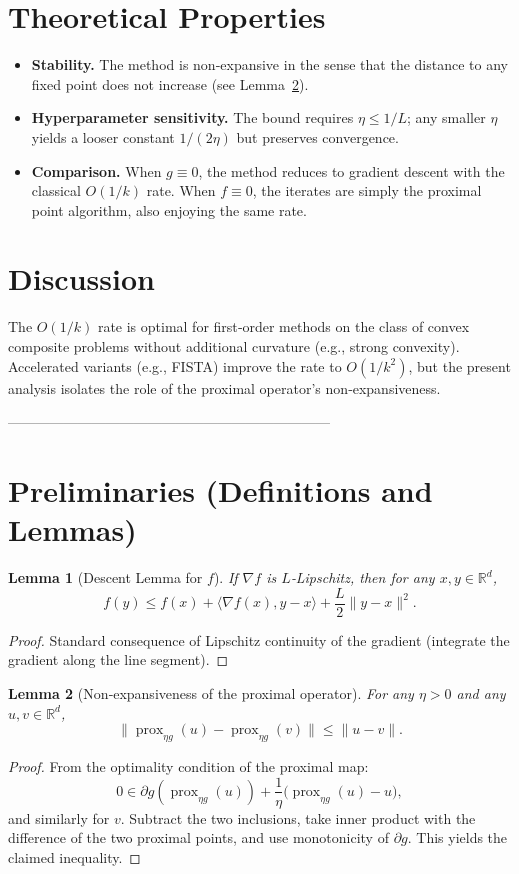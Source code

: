 \documentclass{article}
\newtheorem{lemma}{Lemma}
\newcommand{\prox}{\operatorname{prox}}
\newcommand{\grad}{\nabla}
\newcommand{\R}{\mathbb{R}}
\begin{document}
\section*{Theoretical Properties}
\begin{itemize}
  \item \textbf{Stability.} The method is non‑expansive in the sense that the distance to any fixed point does not increase (see Lemma~\ref{lem:nonexp}).
  \item \textbf{Hyperparameter sensitivity.} The bound requires $\eta\le 1/L$; any smaller $\eta$ yields a looser constant $1/(2\eta)$ but preserves convergence.
  \item \textbf{Comparison.} When $g\equiv0$, the method reduces to gradient descent with the classical $O(1/k)$ rate. When $f\equiv0$, the iterates are simply the proximal point algorithm, also enjoying the same rate.
\end{itemize}

\section*{Discussion}
The $O(1/k)$ rate is optimal for first‑order methods on the class of convex composite problems without additional curvature (e.g., strong convexity). Accelerated variants (e.g., FISTA) improve the rate to $O(1/k^{2})$, but the present analysis isolates the role of the proximal operator’s non‑expansiveness.

---------------------------------------------------------------------

\section*{Preliminaries (Definitions and Lemmas)}
\begin{lemma}[Descent Lemma for $f$]\label{lem:descent}
If $\grad f$ is $L$‑Lipschitz, then for any $x,y\in\R^{d}$,
\[
f(y)\le f(x)+\langle\grad f(x),y-x\rangle+\frac{L}{2}\|y-x\|^{2}.
\]
\end{lemma}
\begin{proof}
Standard consequence of Lipschitz continuity of the gradient (integrate the gradient along the line segment). \hfill\qedsymbol
\end{proof}
\begin{lemma}[Non‑expansiveness of the proximal operator]\label{lem:nonexp}
For any $\eta>0$ and any $u,v\in\R^{d}$,
\[
\bigl\|\prox_{\eta g}(u)-\prox_{\eta g}(v)\bigr\|\le\|u-v\|.
\]
\end{lemma}
\begin{proof}
From the optimality condition of the proximal map:
\[
0\in\partial g(\prox_{\eta g}(u))+\frac{1}{\eta}\bigl(\prox_{\eta g}(u)-u\bigr),
\]
and similarly for $v$. Subtract the two inclusions, take inner product with the difference of the two proximal points, and use monotonicity of $\partial g$. This yields the claimed inequality. \hfill\qedsymbol
\end{proof}
\end{document}
